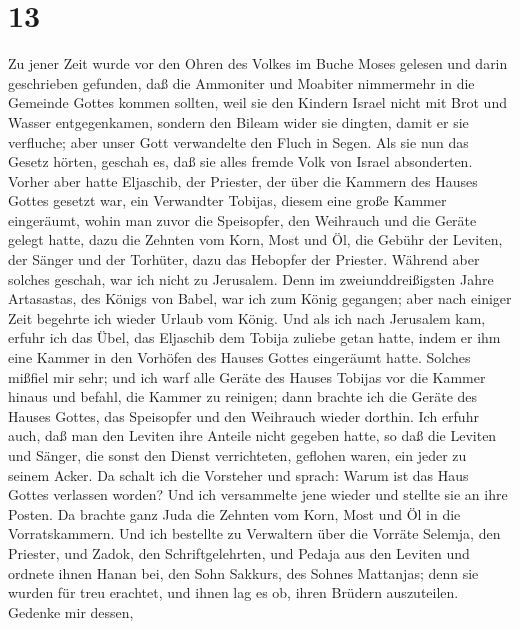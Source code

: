 \hypertarget{section-12}{%
\section{13}\label{section-12}}

 Zu jener Zeit wurde vor den Ohren des Volkes im Buche
Moses gelesen und darin geschrieben gefunden, daß die Ammoniter und
Moabiter nimmermehr in die Gemeinde Gottes kommen sollten,
 weil sie den Kindern Israel nicht mit Brot und Wasser
entgegenkamen, sondern den Bileam wider sie dingten, damit er sie
verfluche; aber unser Gott verwandelte den Fluch in Segen.
 Als sie nun das Gesetz hörten, geschah es, daß sie alles
fremde Volk von Israel absonderten.  Vorher aber hatte
Eljaschib, der Priester, der über die Kammern des Hauses Gottes gesetzt
war, ein Verwandter Tobijas,  diesem eine große Kammer
eingeräumt, wohin man zuvor die Speisopfer, den Weihrauch und die Geräte
gelegt hatte, dazu die Zehnten vom Korn, Most und Öl, die Gebühr der
Leviten, der Sänger und der Torhüter, dazu das Hebopfer der Priester.
 Während aber solches geschah, war ich nicht zu Jerusalem.
Denn im zweiunddreißigsten Jahre Artasastas, des Königs von Babel, war
ich zum König gegangen; aber nach einiger Zeit begehrte ich wieder
Urlaub vom König.  Und als ich nach Jerusalem kam, erfuhr
ich das Übel, das Eljaschib dem Tobija zuliebe getan hatte, indem er ihm
eine Kammer in den Vorhöfen des Hauses Gottes eingeräumt hatte.
 Solches mißfiel mir sehr; und ich warf alle Geräte des
Hauses Tobijas vor die Kammer hinaus  und befahl, die
Kammer zu reinigen; dann brachte ich die Geräte des Hauses Gottes, das
Speisopfer und den Weihrauch wieder dorthin.  Ich erfuhr
auch, daß man den Leviten ihre Anteile nicht gegeben hatte, so daß die
Leviten und Sänger, die sonst den Dienst verrichteten, geflohen waren,
ein jeder zu seinem Acker.  Da schalt ich die Vorsteher
und sprach: Warum ist das Haus Gottes verlassen worden? Und ich
versammelte jene wieder und stellte sie an ihre Posten. 
Da brachte ganz Juda die Zehnten vom Korn, Most und Öl in die
Vorratskammern.  Und ich bestellte zu Verwaltern über die
Vorräte Selemja, den Priester, und Zadok, den Schriftgelehrten, und
Pedaja aus den Leviten und ordnete ihnen Hanan bei, den Sohn Sakkurs,
des Sohnes Mattanjas; denn sie wurden für treu erachtet, und ihnen lag
es ob, ihren Brüdern auszuteilen.  Gedenke mir dessen,
